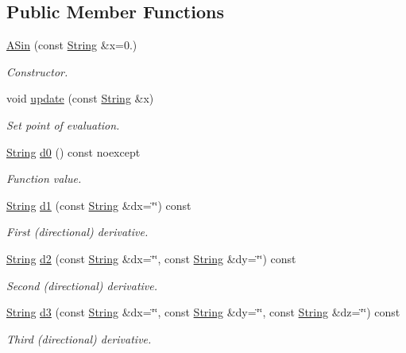 \subsection*{Public Member Functions}
\begin{DoxyCompactItemize}
\item 
\hyperlink{structFunG_1_1stringify_1_1ASin_aca25529c56e115596bfbcc3626402fd0}{A\-Sin} (const \hyperlink{structFunG_1_1String}{String} \&x=0.)
\begin{DoxyCompactList}\small\item\em Constructor. \end{DoxyCompactList}\item 
void \hyperlink{structFunG_1_1stringify_1_1ASin_a64c2bce514b723de5c74fa065b421e84}{update} (const \hyperlink{structFunG_1_1String}{String} \&x)
\begin{DoxyCompactList}\small\item\em Set point of evaluation. \end{DoxyCompactList}\item 
\hyperlink{structFunG_1_1String}{String} \hyperlink{structFunG_1_1stringify_1_1ASin_ade113a4ab8da145b96d04e0eff91c950}{d0} () const noexcept
\begin{DoxyCompactList}\small\item\em Function value. \end{DoxyCompactList}\item 
\hyperlink{structFunG_1_1String}{String} \hyperlink{structFunG_1_1stringify_1_1ASin_a0550e0db287b081d6554c5298cea8ee9}{d1} (const \hyperlink{structFunG_1_1String}{String} \&dx=\char`\"{}\char`\"{}) const 
\begin{DoxyCompactList}\small\item\em First (directional) derivative. \end{DoxyCompactList}\item 
\hyperlink{structFunG_1_1String}{String} \hyperlink{structFunG_1_1stringify_1_1ASin_aa45d16f6651de241813394227f188f1d}{d2} (const \hyperlink{structFunG_1_1String}{String} \&dx=\char`\"{}\char`\"{}, const \hyperlink{structFunG_1_1String}{String} \&dy=\char`\"{}\char`\"{}) const 
\begin{DoxyCompactList}\small\item\em Second (directional) derivative. \end{DoxyCompactList}\item 
\hyperlink{structFunG_1_1String}{String} \hyperlink{structFunG_1_1stringify_1_1ASin_ad26988249ea53ebbc450975260cdcc2c}{d3} (const \hyperlink{structFunG_1_1String}{String} \&dx=\char`\"{}\char`\"{}, const \hyperlink{structFunG_1_1String}{String} \&dy=\char`\"{}\char`\"{}, const \hyperlink{structFunG_1_1String}{String} \&dz=\char`\"{}\char`\"{}) const 
\begin{DoxyCompactList}\small\item\em Third (directional) derivative. \end{DoxyCompactList}\end{DoxyCompactItemize}



